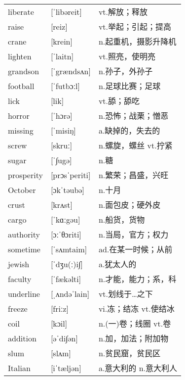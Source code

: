 \documentclass[a4paper]{article}
\begin{document}
\section{}
\begin{tabular}{l l l}

liberate & [ˈlibəreit] & vt.解放；释放 \\
raise & [reiz] & vt.举起；引起；提高 \\
crane & [krein] & n.起重机，摄影升降机 \\
lighten & [ˈlaitn] & vt.照亮，使明亮 \\
grandson & [ˈgrændsʌn] & n.孙子，外孙子 \\
football & [ˈfutbɔːl] & n.足球比赛；足球 \\
lick & [lik] & vt.舔；舔吃 \\
horror & [ˈhɔrə] & n.恐怖；战栗；憎恶 \\
missing & [ˈmisiŋ] & a.缺掉的，失去的 \\
screw & [skruː] & n.螺旋，螺丝 vt.拧紧 \\
sugar & [ˈ∫ugə] & n.糖 \\
prosperity & [prɔsˈperiti] & n.繁荣；昌盛，兴旺 \\
October & [ɔkˈtəubə] & n.十月 \\
crust & [krʌst] & n.面包皮；硬外皮 \\
cargo & [ˈkɑːgəu] & n.船货，货物 \\
authority & [ɔːˈθɔriti] & n.当局，官方；权力 \\
sometime & [ˈsʌmtaim] & ad.在某一时候；从前 \\
jewish & [ˈdʒu(ː)i∫] & a.犹太人的 \\
faculty & [ˈfækəlti] & n.才能，能力；系，科 \\
underline & [ˌʌndəˈlain] & vt.划线于…之下 \\
freeze & [friːz] & vi.冻；结冻 vt.使结冰 \\
coil & [kɔil] & n.(一)卷；线圈 vt.卷 \\
addition & [əˈdi∫ən] & n.加，加法；附加物 \\
slum & [slʌm] & n.贫民窟，贫民区 \\
Italian & [iˈtæljən] & a.意大利的 n.意大利人 \\

\end{tabular}
\end{document}
